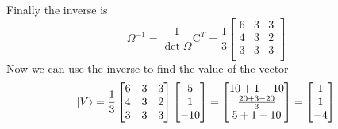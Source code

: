 \documentclass[../main.tex]{subfiles}
\begin{document}
Finally the inverse is 
\begin{equation*}
    \Omega^{-1}=\frac{1}{\det\Omega}\text{C}^T=\frac{1}{3}
    \begin{bmatrix}
        6&3&3\\
        4&3&2\\
        3&3&3\\
    \end{bmatrix}
\end{equation*}
Now we can use the inverse to find the value of the vector
\begin{equation*}
    \ket{V}=\frac{1}{3}
    \begin{bmatrix}
        6&3&3\\
        4&3&2\\
        3&3&3\\
    \end{bmatrix}
    \begin{bmatrix}
        5\\
        1\\
        -10
    \end{bmatrix}
    =\begin{bmatrix}
        10+1-10\\
        \frac{20+3-20}{3}\\
        5+1-10\\
    \end{bmatrix}
    =
    \begin{bmatrix}
        1\\
        1\\
        -4
    \end{bmatrix}
\end{equation*}
\end{document}
